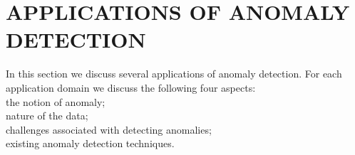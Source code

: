 \section{APPLICATIONS OF ANOMALY DETECTION}
\label{sec:applicationsOfDLAD}



In this section we discuss several applications of anomaly detection. For each application
domain we discuss the following four aspects:\\
\textemdash the notion of anomaly;\\
\textemdash nature of the data;\\
\textemdash challenges associated with detecting anomalies;\\
\textemdash existing anomaly detection techniques.\\

% 


\label{sec:malwareDetection}


\label{sec:industrialDamageDetect}



\label{sec:videoSurvelliance}



\label{sec:socialNetworks}

% 


\label{sec:logAnomaly}



\label{sec:medicalAnomalyDetect}



\label{sec:iotBigDataAnomaly}



\label{sec:sensorNetworkAnomaly}






